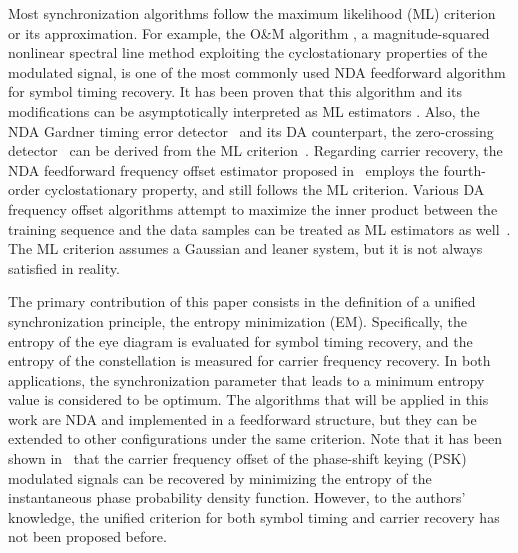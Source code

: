 \documentclass[journal,comsoc,onecolumn, 12pt,draftclsnofoot]{IEEEtran}
\begin{document}
Most synchronization algorithms follow the maximum likelihood (ML) criterion or its approximation.
For example, the O\&M algorithm \cite{Oerder1988}, a magnitude-squared nonlinear spectral line method exploiting the cyclostationary properties of the modulated signal, is one of the most commonly used NDA feedforward algorithm for symbol timing recovery.
It has been proven that this algorithm and its modifications can be asymptotically interpreted as ML estimators \cite{YanWang2002,Lopez-Salcedo2006}.
Also, the NDA Gardner timing error detector~\cite{Gardner1986} and its DA counterpart, the zero-crossing detector~\cite{gardner1988demodulator} can be derived from the ML criterion~\cite{Oerder1987}.
Regarding carrier recovery, the NDA feedforward frequency offset estimator proposed in~\cite{Wang2004} employs the fourth-order cyclostationary property, and still follows the ML criterion.
Various DA frequency offset algorithms attempt to maximize the inner product between the  training sequence and the data samples can be treated as ML estimators as well~\cite{mengali1997synchronization}.
The ML criterion assumes a Gaussian and leaner system, but it is not always satisfied in reality. 

The primary contribution of this paper consists in the definition of a unified synchronization principle, the entropy minimization (EM). 
Specifically, the entropy of the eye diagram is evaluated for symbol timing recovery, and the entropy of the constellation is measured for carrier frequency recovery.
In both applications, the synchronization parameter that leads to a minimum entropy value is considered to be optimum.
The algorithms that will be applied in this work are NDA and implemented in a feedforward structure, but they can be extended to other configurations under the same criterion.
Note that it has been shown in~\cite{Pedzisz2006} that the carrier frequency offset of the phase-shift keying (PSK) modulated signals can be recovered by minimizing the entropy of the instantaneous phase probability density function.
However, to the authors' knowledge,  the unified criterion for both symbol timing and carrier recovery has not been proposed before. 
\end{document}
